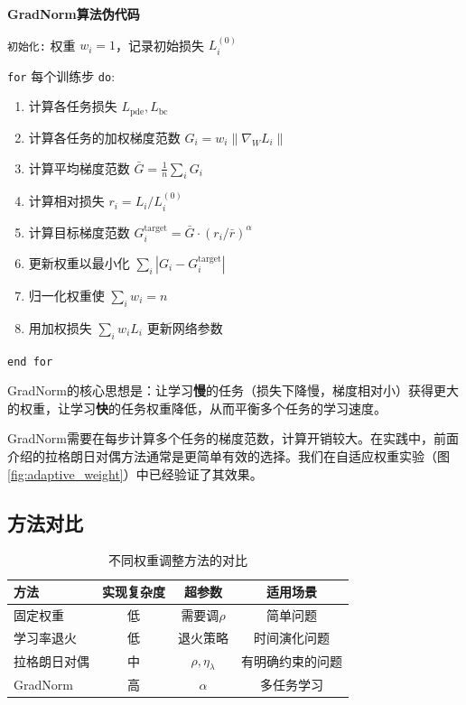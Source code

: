 \begin{framed}
\textbf{GradNorm算法伪代码}

\texttt{初始化:} 权重 $w_i = 1$，记录初始损失 $L_i^{(0)}$

\texttt{for} 每个训练步 \texttt{do}:
\begin{enumerate}[label=\arabic*., leftmargin=2em]
    \item 计算各任务损失 $L_{\text{pde}}, L_{\text{bc}}$
    \item 计算各任务的加权梯度范数 $G_i = w_i \|\nabla_W L_i\|$
    \item 计算平均梯度范数 $\bar{G} = \frac{1}{n}\sum_i G_i$
    \item 计算相对损失 $r_i = L_i / L_i^{(0)}$
    \item 计算目标梯度范数 $G_i^{\text{target}} = \bar{G} \cdot (r_i / \bar{r})^\alpha$
    \item 更新权重以最小化 $\sum_i |G_i - G_i^{\text{target}}|$
    \item 归一化权重使 $\sum_i w_i = n$
    \item 用加权损失 $\sum_i w_i L_i$ 更新网络参数
\end{enumerate}
\texttt{end for}
\end{framed}

GradNorm的核心思想是：让学习\textbf{慢}的任务（损失下降慢，梯度相对小）获得更大的权重，让学习\textbf{快}的任务权重降低，从而平衡多个任务的学习速度。

\begin{remark}
GradNorm需要在每步计算多个任务的梯度范数，计算开销较大。在实践中，前面介绍的拉格朗日对偶方法通常是更简单有效的选择。我们在自适应权重实验（图\ref{fig:adaptive_weight}）中已经验证了其效果。
\end{remark}

\subsection{方法对比}

\begin{table}[htbp]
\centering
\caption{不同权重调整方法的对比}
\begin{tabular}{l|ccc}
\hline
\textbf{方法} & \textbf{实现复杂度} & \textbf{超参数} & \textbf{适用场景} \\
\hline
固定权重 & 低 & 需要调$\rho$ & 简单问题 \\
学习率退火 & 低 & 退火策略 & 时间演化问题 \\
拉格朗日对偶 & 中 & $\rho, \eta_\lambda$ & 有明确约束的问题 \\
GradNorm & 高 & $\alpha$ & 多任务学习 \\
\hline
\end{tabular}
\end{table}

